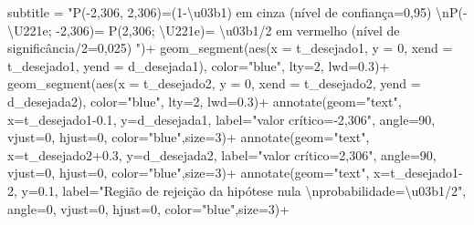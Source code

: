 \documentclass[
]{book}
\newenvironment{Shaded}{\begin{snugshade}}{\end{snugshade}}
\newcommand{\AttributeTok}[1]{\textcolor[rgb]{0.77,0.63,0.00}{#1}}
\newcommand{\DecValTok}[1]{\textcolor[rgb]{0.00,0.00,0.81}{#1}}
\newcommand{\FloatTok}[1]{\textcolor[rgb]{0.00,0.00,0.81}{#1}}
\newcommand{\FunctionTok}[1]{\textcolor[rgb]{0.00,0.00,0.00}{#1}}
\newcommand{\NormalTok}[1]{#1}
\newcommand{\SpecialCharTok}[1]{\textcolor[rgb]{0.00,0.00,0.00}{#1}}
\newcommand{\StringTok}[1]{\textcolor[rgb]{0.31,0.60,0.02}{#1}}
\begin{document}
\begin{Shaded}
\begin{Highlighting}[]
       \AttributeTok{subtitle =} \StringTok{"P({-}2,306, 2,306)=(1{-}\textbackslash{}u03b1) em cinza (nível de confiança=0,95) }\SpecialCharTok{\textbackslash{}n}\StringTok{P({-}\textbackslash{}U221e; {-}2,306)= P(2,306; \textbackslash{}U221e)= \textbackslash{}u03b1/2 em vermelho (nível de significância/2=0,025) "}\NormalTok{)}\SpecialCharTok{+} \FunctionTok{geom\_segment}\NormalTok{(}\FunctionTok{aes}\NormalTok{(}\AttributeTok{x =}\NormalTok{ t\_desejado1, }\AttributeTok{y =} \DecValTok{0}\NormalTok{, }\AttributeTok{xend =}\NormalTok{ t\_desejado1, }\AttributeTok{yend =}\NormalTok{ d\_desejada1), }\AttributeTok{color=}\StringTok{"blue"}\NormalTok{, }\AttributeTok{lty=}\DecValTok{2}\NormalTok{, }\AttributeTok{lwd=}\FloatTok{0.3}\NormalTok{)}\SpecialCharTok{+}
 \FunctionTok{geom\_segment}\NormalTok{(}\FunctionTok{aes}\NormalTok{(}\AttributeTok{x =}\NormalTok{ t\_desejado2, }\AttributeTok{y =} \DecValTok{0}\NormalTok{, }\AttributeTok{xend =}\NormalTok{ t\_desejado2, }\AttributeTok{yend =}\NormalTok{ d\_desejada2), }\AttributeTok{color=}\StringTok{"blue"}\NormalTok{, }\AttributeTok{lty=}\DecValTok{2}\NormalTok{, }\AttributeTok{lwd=}\FloatTok{0.3}\NormalTok{)}\SpecialCharTok{+}
  \FunctionTok{annotate}\NormalTok{(}\AttributeTok{geom=}\StringTok{"text"}\NormalTok{, }\AttributeTok{x=}\NormalTok{t\_desejado1}\FloatTok{{-}0.1}\NormalTok{, }\AttributeTok{y=}\NormalTok{d\_desejada1, }\AttributeTok{label=}\StringTok{"valor crítico={-}2,306"}\NormalTok{, }\AttributeTok{angle=}\DecValTok{90}\NormalTok{, }\AttributeTok{vjust=}\DecValTok{0}\NormalTok{, }\AttributeTok{hjust=}\DecValTok{0}\NormalTok{, }\AttributeTok{color=}\StringTok{"blue"}\NormalTok{,}\AttributeTok{size=}\DecValTok{3}\NormalTok{)}\SpecialCharTok{+}
  \FunctionTok{annotate}\NormalTok{(}\AttributeTok{geom=}\StringTok{"text"}\NormalTok{, }\AttributeTok{x=}\NormalTok{t\_desejado2}\FloatTok{+0.3}\NormalTok{, }\AttributeTok{y=}\NormalTok{d\_desejada2, }\AttributeTok{label=}\StringTok{"valor crítico=2,306"}\NormalTok{, }\AttributeTok{angle=}\DecValTok{90}\NormalTok{, }\AttributeTok{vjust=}\DecValTok{0}\NormalTok{, }\AttributeTok{hjust=}\DecValTok{0}\NormalTok{, }\AttributeTok{color=}\StringTok{"blue"}\NormalTok{,}\AttributeTok{size=}\DecValTok{3}\NormalTok{)}\SpecialCharTok{+}
 \FunctionTok{annotate}\NormalTok{(}\AttributeTok{geom=}\StringTok{"text"}\NormalTok{, }\AttributeTok{x=}\NormalTok{t\_desejado1}\DecValTok{{-}2}\NormalTok{, }\AttributeTok{y=}\FloatTok{0.1}\NormalTok{, }\AttributeTok{label=}\StringTok{"Região de rejeição da hipótese nula }\SpecialCharTok{\textbackslash{}n}\StringTok{probabilidade=\textbackslash{}u03b1/2"}\NormalTok{, }\AttributeTok{angle=}\DecValTok{0}\NormalTok{, }\AttributeTok{vjust=}\DecValTok{0}\NormalTok{, }\AttributeTok{hjust=}\DecValTok{0}\NormalTok{, }\AttributeTok{color=}\StringTok{"blue"}\NormalTok{,}\AttributeTok{size=}\DecValTok{3}\NormalTok{)}\SpecialCharTok{+}

\end{Highlighting}
\end{Shaded}
\end{document}
